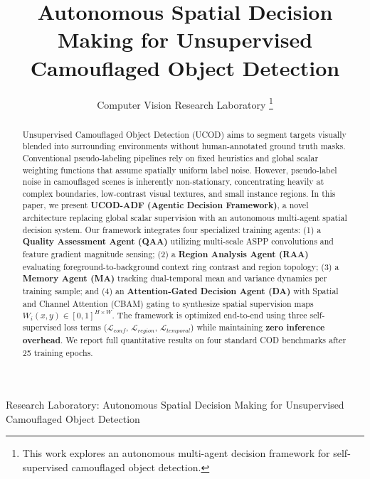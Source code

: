 \documentclass[journal,twoside,web]{IEEEtran}
\newcommand{\methodname}{UCOD-ADF}
\begin{document}
\title{Autonomous Spatial Decision Making for Unsupervised Camouflaged Object Detection}

\author{Computer Vision Research Laboratory
\thanks{This work explores an autonomous multi-agent decision framework for self-supervised camouflaged object detection.}}

%
{Research Laboratory: Autonomous Spatial Decision Making for Unsupervised Camouflaged Object Detection}

\maketitle

\begin{abstract}
Unsupervised Camouflaged Object Detection (UCOD) aims to segment targets visually blended into surrounding environments without human-annotated ground truth masks. Conventional pseudo-labeling pipelines rely on fixed heuristics and global scalar weighting functions that assume spatially uniform label noise. However, pseudo-label noise in camouflaged scenes is inherently non-stationary, concentrating heavily at complex boundaries, low-contrast visual textures, and small instance regions. In this paper, we present \textbf{\methodname{} (Agentic Decision Framework)}, a novel architecture replacing global scalar supervision with an autonomous multi-agent spatial decision system. Our framework integrates four specialized training agents: (1) a \textbf{Quality Assessment Agent (QAA)} utilizing multi-scale ASPP convolutions and feature gradient magnitude sensing; (2) a \textbf{Region Analysis Agent (RAA)} evaluating foreground-to-background context ring contrast and region topology; (3) a \textbf{Memory Agent (MA)} tracking dual-temporal mean and variance dynamics per training sample; and (4) an \textbf{Attention-Gated Decision Agent (DA)} with Spatial and Channel Attention (CBAM) gating to synthesize spatial supervision maps $W_i(x,y) \in [0,1]^{H \times W}$. The framework is optimized end-to-end using three self-supervised loss terms ($\mathcal{L}_{conf}$, $\mathcal{L}_{region}$, $\mathcal{L}_{temporal}$) while maintaining \textbf{zero inference overhead}. We report full quantitative results on four standard COD benchmarks after 25 training epochs.
\end{abstract}
\end{document}
